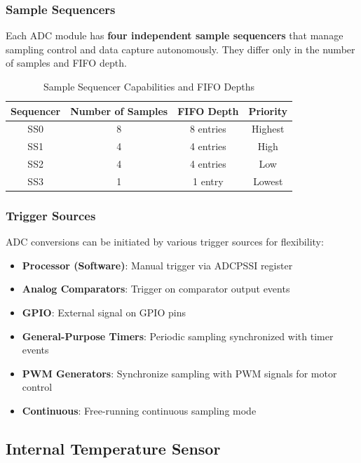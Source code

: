 \subsubsection{Sample Sequencers}

Each ADC module has \textbf{four independent sample sequencers} that manage sampling control and data capture autonomously. They differ only in the number of samples and FIFO depth.

\begin{table}[H]
\centering
\begin{tabular}{cccc}
\toprule
\textbf{Sequencer} & \textbf{Number of Samples} & \textbf{FIFO Depth} & \textbf{Priority} \\
\midrule
SS0 & 8 & 8 entries & Highest \\
SS1 & 4 & 4 entries & High \\
SS2 & 4 & 4 entries & Low \\
SS3 & 1 & 1 entry & Lowest \\
\bottomrule
\end{tabular}
\caption{Sample Sequencer Capabilities and FIFO Depths}
\end{table}

\subsubsection{Trigger Sources}

ADC conversions can be initiated by various trigger sources for flexibility:

\begin{itemize}[nosep]
  \item \textbf{Processor (Software)}: Manual trigger via ADCPSSI register
  \item \textbf{Analog Comparators}: Trigger on comparator output events
  \item \textbf{GPIO}: External signal on GPIO pins
  \item \textbf{General-Purpose Timers}: Periodic sampling synchronized with timer events
  \item \textbf{PWM Generators}: Synchronize sampling with PWM signals for motor control
  \item \textbf{Continuous}: Free-running continuous sampling mode
\end{itemize}


\subsection{Internal Temperature Sensor}

